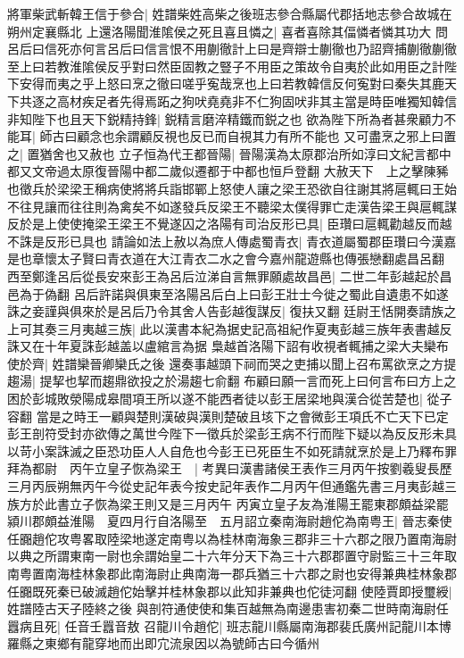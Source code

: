 將軍柴武斬韓王信于參合|{
	姓譜柴姓高柴之後班志參合縣屬代郡括地志參合故城在朔州定襄縣北}
上還洛陽聞淮隂侯之死且喜且憐之|{
	喜者喜除其偪憐者憐其功大}
問呂后曰信死亦何言呂后曰信言恨不用蒯徹計上曰是齊辯士蒯徹也乃詔齊捕蒯徹蒯徹至上曰若教淮隂侯反乎對曰然臣固教之豎子不用臣之策故令自夷於此如用臣之計陛下安得而夷之乎上怒曰烹之徹曰嗟乎寃哉烹也上曰若教韓信反何寃對曰秦失其鹿天下共逐之高材疾足者先得焉跖之狗吠堯堯非不仁狗固吠非其主當是時臣唯獨知韓信非知陛下也且天下鋭精持鋒|{
	鋭精言磨淬精鐵而鋭之也}
欲為陛下所為者甚衆顧力不能耳|{
	師古曰顧念也余謂顧反視也反已而自視其力有所不能也}
又可盡烹之邪上曰置之|{
	置猶舍也又赦也}
立子恒為代王都晉陽|{
	晉陽漢為太原郡治所如淳曰文紀言都中都又文帝過太原復晉陽中都二歲似遷都于中都也恒戶登翻}
大赦天下　上之擊陳豨也徵兵於梁梁王稱病使將將兵詣邯鄲上怒使人讓之梁王恐欲自往謝其將扈輒曰王始不往見讓而往往則為禽矣不如遂發兵反梁王不聽梁太僕得罪亡走漢告梁王與扈輒謀反於是上使使掩梁王梁王不覺遂囚之洛陽有司治反形已具|{
	臣瓚曰扈輒勸越反而越不誅是反形已具也}
請論如法上赦以為庶人傳處蜀青衣|{
	青衣道屬蜀郡臣瓚曰今漢嘉是也章懷太子賢曰青衣道在大江青衣二水之會今嘉州龍遊縣也傳張戀翻處昌呂翻}
西至鄭逢呂后從長安來彭王為呂后泣涕自言無罪願處故昌邑|{
	二世二年彭越起於昌邑為于偽翻}
呂后許諾與俱東至洛陽呂后白上曰彭王壯士今徙之蜀此自遺患不如遂誅之妾謹與俱來於是呂后乃令其舍人告彭越復謀反|{
	復扶又翻}
廷尉王恬開奏請族之上可其奏三月夷越三族|{
	此以漢書本紀為据史記高祖紀作夏夷彭越三族年表書越反誅又在十年夏誅彭越盖以盧綰言為据}
梟越首洛陽下詔有收視者輒捕之梁大夫欒布使於齊|{
	姓譜欒晉卿欒氏之後}
還奏事越頭下祠而哭之吏捕以聞上召布罵欲烹之方提趨湯|{
	提挈也挈而趨鼎欲投之於湯趨七俞翻}
布顧曰願一言而死上曰何言布曰方上之困於彭城敗滎陽成皋間項王所以遂不能西者徒以彭王居梁地與漢合從苦楚也|{
	從子容翻}
當是之時王一顧與楚則漢破與漢則楚破且垓下之會微彭王項氏不亡天下已定彭王剖符受封亦欲傳之萬世今陛下一徵兵於梁彭王病不行而陛下疑以為反反形未具以苛小案誅滅之臣恐功臣人人自危也今彭王已死臣生不如死請就烹於是上乃釋布罪拜為都尉　丙午立皇子恢為梁王　|{
	考異曰漢書諸侯王表作三月丙午按劉羲叟長歷三月丙辰朔無丙午今從史記年表今按史記年表作二月丙午但通鑑先書三月夷彭越三族方於此書立子恢為梁王則又是三月丙午}
丙寅立皇子友為淮陽王罷東郡頗益梁罷潁川郡頗益淮陽　夏四月行自洛陽至　五月詔立秦南海尉趙佗為南粤王|{
	晉志秦使任嚻趙佗攻粤畧取陸梁地遂定南粤以為桂林南海象三郡非三十六郡之限乃置南海尉以典之所謂東南一尉也余謂始皇二十六年分天下為三十六郡郡置守尉監三十三年取南粤置南海桂林象郡此南海尉止典南海一郡兵猶三十六郡之尉也安得兼典桂林象郡任嚻既死秦已破滅趙佗始擊并桂林象郡以此知非兼典也佗徒河翻}
使陸賈即授璽綬|{
	姓譜陸古天子陸終之後}
與剖符通使使和集百越無為南邊患害初秦二世時南海尉任囂病且死|{
	任音壬囂音敖}
召龍川令趙佗|{
	班志龍川縣屬南海郡裴氏廣州記龍川本博羅縣之東鄉有龍穿地而出即宂流泉因以為號師古曰今循州}
